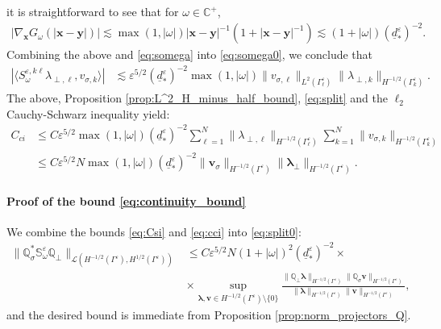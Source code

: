 \documentclass[]{article}
\numberwithin{equation}{section}
\numberwithin{theorem}{section}
\numberwithin{lemma}{section}
\numberwithin{corollary}{section}
\numberwithin{proposition}{section}
\numberwithin{definition}{section}
\newcommand{\bx}{\boldsymbol{x}}
\newcommand{\by}{\boldsymbol{y}}
\newcommand{\re}{\varepsilon}
\renewcommand{\vec}{\boldsymbol}
\begin{document}
	it is straightforward to see that for $\omega\in \mathbb{C}^+$,
	\begin{align}
		\label{eq:bound_grad_G}
		|\nabla_{\vec{x}}G_{\omega}(|\bx-\by|)|\lesssim \max(1,|\omega|) |\vec{x}-\vec{y}|^{-1}\left(1+|\vec{x}-\vec{y}|^{-1}\right)\lesssim (1+|\omega|)(\underline{d}^{\re}_*)^{-2}.
	\end{align}
	Combining the above and \eqref{eq:somega} into \eqref{eq:somega0}, we conclude that 
	\begin{align*}%
		|\langle S_{\omega}^{\re,k\ell}\lambda_{\perp,\ell}, v_{\sigma,k}\rangle| &\lesssim \re^{5/2} (\underline{d}^{\re}_*)^{-2}\max(1,|\omega|) \|v_{\sigma,\ell}\|_{L^2(\Gamma^{\re}_{\ell})}\|\lambda_{\perp, k}\|_{H^{-1/2}(\Gamma^{\re}_k)}.
	\end{align*}
	The above, Proposition \ref{prop:L^2_H_minus_half_bound},  \eqref{eq:split} and the $\ell_2$ Cauchy-Schwarz inequality yield:
	\begin{align}
		\nonumber
		C_{ci} &\leq C \varepsilon^{5/2} \max(1,|\omega|) (\underline{d}^{\re}_{*})^{-2} \sum_{\ell=1}^N \|\lambda_{\perp,\ell}\|_{H^{-1/2}(\Gamma^{\re}_{\ell})} \sum_{k=1}^N \| v_{\sigma, k} \|_{H^{-1/2}(\Gamma^{\re}_k)} \\
		\label{eq:cci}
		&\leq  C \varepsilon^{5/2} N \max(1,|\omega|) (\underline{d}^{\re}_{*})^{-2} \| \vec{v}_{\sigma} \|_{H^{-1/2}(\Gamma^{\re})} \| \vec{\lambda}_{\perp} \|_{H^{-1/2}(\Gamma^{\re})}.
	\end{align}
	\paragraph{Proof of the bound \eqref{eq:continuity_bound}}
	We combine the bounds \eqref{eq:Csi} and \eqref{eq:cci} into \eqref{eq:split0}: 
	\begin{align*}%
		\| \mathbb{Q}_{\sigma}^*\mathbb{S}^{\re}_{\omega}\mathbb{Q}_{\perp} \|_{\mathcal{L}( H^{-1/2}(\Gamma^{\re}), H^{1/2}(\Gamma^{\re}))} &\leq
		C\re^{5/2}N (1+|\omega|)^2(\underline{d}^{\re}_{*})^{-2} \times \\
		& \times\sup_{\vec{\lambda}, \vec{v}  \in H^{-1/2}(\Gamma^{\re}) \setminus \{0\}} \frac{ \|\mathbb{Q}_{\perp}\vec{\lambda}\|_{H^{-1/2}(\Gamma^{\re})} \|\mathbb{Q}_{\sigma}\vec{v}\|_{H^{-1/2}(\Gamma^{\re})}}{\| \vec{\lambda} \|_{H^{-1/2}(\Gamma^{\re})} \| \vec{v} \|_{H^{-1/2}(\Gamma^{\re})}},
	\end{align*}
	and the desired bound is immediate from Proposition \ref{prop:norm_projectors_Q}.
	
\end{document}
